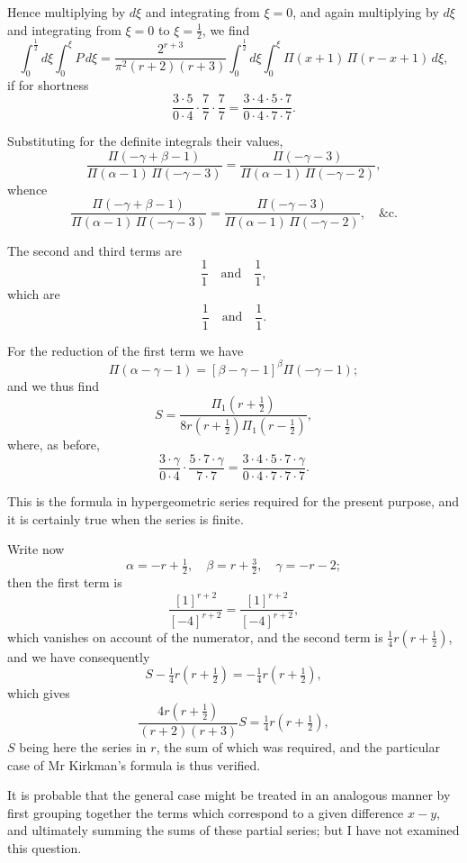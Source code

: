 \documentclass[11pt,a4paper]{book}
\begin{document}
Hence multiplying by $d\xi$ and integrating from $\xi=0$, and again multiplying by $d\xi$ and integrating from $\xi=0$ to $\xi=\tfrac{1}{2}$, we find
\[
\int_0^{\frac{1}{2}} d\xi \int_0^{\xi} P\,d\xi = \frac{2^{r+3}}{\pi^2(r+2)(r+3)} \int_0^{\frac{1}{2}} d\xi \int_0^{\xi} \Pi(x+1)\,\Pi(r-x+1)\,d\xi,
\]
if for shortness
\[
\frac{3 \cdot 5}{0 \cdot 4} \cdot \frac{7}{7} \cdot \frac{7}{7} = \frac{3 \cdot 4 \cdot 5 \cdot 7}{0 \cdot 4 \cdot 7 \cdot 7}.
\]

Substituting for the definite integrals their values,
\[
\frac{\Pi(-\gamma+\beta-1)}{\Pi(\alpha-1)\,\Pi(-\gamma-3)} = \frac{\Pi(-\gamma-3)}{\Pi(\alpha-1)\,\Pi(-\gamma-2)},
\]
whence
\[
\frac{\Pi(-\gamma+\beta-1)}{\Pi(\alpha-1)\,\Pi(-\gamma-3)} = \frac{\Pi(-\gamma-3)}{\Pi(\alpha-1)\,\Pi(-\gamma-2)}, \quad \text{&c.}
\]

The second and third terms are
\[
\frac{1}{1} \quad \text{and} \quad \frac{1}{1},
\]
which are
\[
\frac{1}{1} \quad \text{and} \quad \frac{1}{1}.
\]

For the reduction of the first term we have
\[
\Pi(\alpha - \gamma - 1) = [\beta - \gamma - 1]^\beta \Pi(-\gamma - 1);
\]
and we thus find
\[
S = \frac{\Pi_1(r + \tfrac{1}{2})}{8r(r + \tfrac{1}{2})\Pi_1(r - \tfrac{1}{2})},
\]
where, as before,
\[
\frac{3 \cdot \gamma}{0 \cdot 4} \cdot \frac{5 \cdot 7 \cdot \gamma}{7 \cdot 7} = \frac{3 \cdot 4 \cdot 5 \cdot 7 \cdot \gamma}{0 \cdot 4 \cdot 7 \cdot 7 \cdot 7}.
\]

This is the formula in hypergeometric series required for the present purpose, and it is certainly true when the series is finite.

Write now
\[
\alpha = -r + \tfrac{1}{2}, \quad \beta = r + \tfrac{3}{2}, \quad \gamma = -r - 2;
\]
then the first term is
\[
\frac{[1]^{r+2}}{[-4]^{r+2}} = \frac{[1]^{r+2}}{[-4]^{r+2}},
\]
which vanishes on account of the numerator, and the second term is $\tfrac{1}{4}r(r+\tfrac{1}{2})$, and we have consequently
\[
S - \tfrac{1}{4}r(r + \tfrac{1}{2}) = -\tfrac{1}{4}r(r + \tfrac{1}{2}),
\]
which gives
\[
\frac{4r(r+\tfrac{1}{2})}{(r+2)(r+3)} S = \tfrac{1}{4}r(r + \tfrac{1}{2}),
\]
$S$ being here the series in $r$, the sum of which was required, and the particular case of Mr Kirkman's formula is thus verified.

It is probable that the general case might be treated in an analogous manner by first grouping together the terms which correspond to a given difference $x-y$, and ultimately summing the sums of these partial series; but I have not examined this question.
\end{document}
